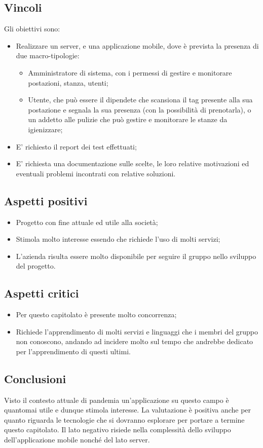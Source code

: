\subsection{Vincoli}
Gli obiettivi sono:
\begin{itemize}
\item	Realizzare un server, e una applicazione mobile, dove è prevista la presenza di due macro-tipologie:
\begin{itemize}
\item	Amministratore di sistema, con i permessi di gestire e monitorare postazioni, stanza, utenti;
\item	Utente, che può essere il dipendete che scansiona il tag presente alla sua postazione e segnala la sua presenza (con la possibilità di prenotarla), o un addetto alle pulizie che può gestire e monitorare le stanze da igienizzare;
\end{itemize}
\item	E' richiesto il report dei test effettuati;
\item	E' richiesta una documentazione sulle scelte, le loro relative motivazioni ed eventuali problemi incontrati con relative soluzioni.
\end{itemize}

\subsection{Aspetti positivi}
\begin{itemize}
\item	Progetto con fine attuale ed utile alla società;
\item	Stimola molto interesse essendo che richiede l'uso di molti servizi;
\item	L'azienda risulta essere molto disponibile per seguire il gruppo nello sviluppo del progetto.
\end{itemize}
\subsection{Aspetti critici}
\begin{itemize}
\item	Per questo capitolato è presente molto concorrenza;
\item	Richiede l'apprendimento di molti servizi e linguaggi che i membri del gruppo non conoscono, andando ad incidere molto sul tempo che andrebbe dedicato per l'apprendimento di questi ultimi.
\end{itemize}

\subsection{Conclusioni}
Visto il contesto attuale di pandemia un'applicazione su questo campo è quantomai utile e dunque stimola interesse. La valutazione è positiva anche per quanto riguarda le tecnologie che si dovranno esplorare per portare a termine questo capitolato. Il lato negativo risiede nella complessità dello sviluppo dell'applicazione mobile nonché del lato server. 
